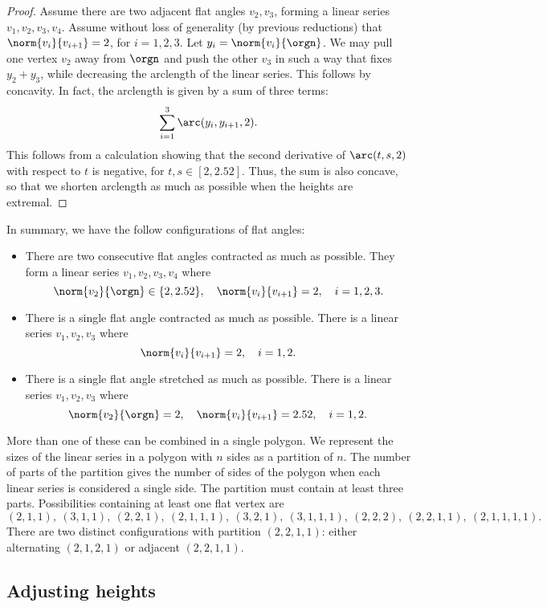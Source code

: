 \begin{proof}
Assume there are two adjacent flat angles $v_2,v_3$, forming a linear series $v_1,v_2,v_3,v_4$.
Assume without loss of generality (by previous reductions) that
$\norm{v_i}{v_{i+1}}=2$, for $i=1,2,3$.
Let $y_i = \norm{v_i}{\orgn}$.
We may pull one vertex $v_2$ away from $\orgn$ and push the other $v_3$ in such a way that fixes $y_2+y_3$, while decreasing the arclength of the linear series.  This follows by concavity.
In fact, the arclength is given by a sum of three terms:
  $$
  \sum_{i=1}^3\arc(y_i,y_{i+1},2).
  $$
This follows from a calculation showing that the second derivative of $\arc(t,s,2)$ with respect to $t$ is negative, for $t,s\in[2,2.52]$.  Thus, the
sum is also concave, so that we shorten arclength as much as possible when the heights are extremal.
\end{proof}

In summary, we have the follow configurations of flat angles:
\begin{itemize}
\item There are two consecutive flat angles contracted as much as possible.  They form a linear series $v_1,v_2,v_3,v_4$ where
$$
\norm{v_2}{\orgn}\in\{2,2.52\},\quad
\norm{v_i}{v_{i+1}}=2,\quad i=1,2,3.
$$
\item There is a single flat angle contracted as much as possible.  There
is a linear series $v_1,v_2,v_3$ where
$$
\norm{v_i}{v_{i+1}}=2,\quad i=1,2.
$$
\item There is a single flat angle stretched as much as possible.  There
is a linear series $v_1,v_2,v_3$ where
$$
\norm{v_2}{\orgn}=2,\quad
\norm{v_i}{v_{i+1}}=2.52,\quad i=1,2.
$$
\end{itemize}

More than one of these can be combined in a single polygon.  We represent the sizes of the linear series in a polygon with $n$ sides as a partition of $n$.
The number of parts of the partition gives the number of sides of the polygon when each linear series is considered a single side.  The partition must contain at least three parts.
Possibilities containing at least one flat vertex are
$$
(2,1,1),~(3,1,1),~(2,2,1),~(2,1,1,1),~(3,2,1),~(3,1,1,1),~(2,2,2),~(2,2,1,1),~(2,1,1,1,1).
$$
There are two distinct configurations with partition $(2,2,1,1)$: either
alternating $(2,1,2,1)$ or adjacent $(2,2,1,1)$.

\subsection{Adjusting heights}

